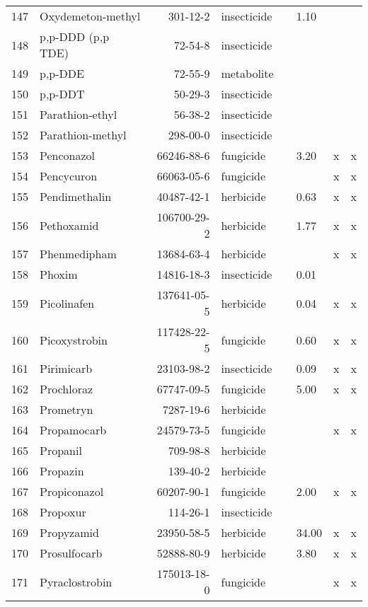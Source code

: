 \begin{longtable}{lp{4cm}rlp{1cm}p{1.5cm}p{1.5cm}p{1cm}}
  147 & Oxydemeton-methyl & 301-12-2 & insecticide &  & 1.10 &  &  \\ 
  148 & p,p-DDD (p,p TDE) & 72-54-8 & insecticide &  &  &  &  \\ 
  149 & p,p-DDE & 72-55-9 & metabolite &  &  &  &  \\ 
  150 & p,p-DDT & 50-29-3 & insecticide &  &  &  &  \\ 
  151 & Parathion-ethyl & 56-38-2 & insecticide &  &  &  &  \\ 
  152 & Parathion-methyl & 298-00-0 & insecticide &  &  &  &  \\ 
  153 & Penconazol & 66246-88-6 & fungicide &  & 3.20 & x & x \\ 
  154 & Pencycuron & 66063-05-6 & fungicide &  &  & x & x \\ 
  155 & Pendimethalin & 40487-42-1 & herbicide &  & 0.63 & x & x \\ 
  156 & Pethoxamid & 106700-29-2 & herbicide &  & 1.77 & x & x \\ 
  157 & Phenmedipham & 13684-63-4 & herbicide &  &  & x & x \\ 
  158 & Phoxim & 14816-18-3 & insecticide &  & 0.01 &  &  \\ 
  159 & Picolinafen & 137641-05-5 & herbicide &  & 0.04 & x & x \\ 
  160 & Picoxystrobin & 117428-22-5 & fungicide &  & 0.60 & x & x \\ 
  161 & Pirimicarb & 23103-98-2 & insecticide &  & 0.09 & x & x \\ 
  162 & Prochloraz & 67747-09-5 & fungicide &  & 5.00 & x & x \\ 
  163 & Prometryn & 7287-19-6 & herbicide &  &  &  &  \\ 
  164 & Propamocarb & 24579-73-5 & fungicide &  &  & x & x \\ 
  165 & Propanil & 709-98-8 & herbicide &  &  &  &  \\ 
  166 & Propazin & 139-40-2 & herbicide &  &  &  &  \\ 
  167 & Propiconazol & 60207-90-1 & fungicide &  & 2.00 & x & x \\ 
  168 & Propoxur & 114-26-1 & insecticide &  &  &  &  \\ 
  169 & Propyzamid & 23950-58-5 & herbicide &  & 34.00 & x & x \\ 
  170 & Prosulfocarb & 52888-80-9 & herbicide &  & 3.80 & x & x \\ 
  171 & Pyraclostrobin & 175013-18-0 & fungicide &  &  & x & x \\ 

\end{longtable}
